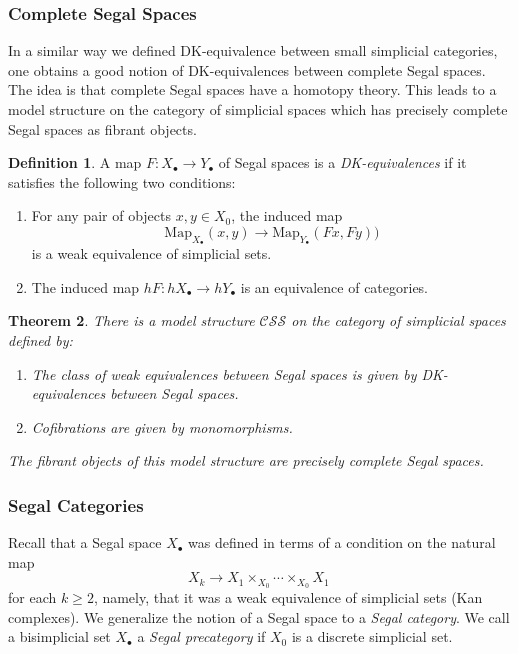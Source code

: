 \documentclass[a4paper,11pt]{article}
\newcommand{\ccal}{\mathcal{C}}
\newcommand{\scal}{\mathcal{S}}
\theoremstyle{plain}
\newtheorem{thm}{Theorem}[section]
\theoremstyle{definition}
\newtheorem{defi}[thm]{Definition}
\theoremstyle{remark}
\begin{document}
\subsubsection{Complete Segal Spaces}

In a similar way we defined DK-equivalence between small simplicial categories, one obtains a good notion of DK-equivalences between complete Segal spaces. The idea is that complete Segal spaces have a  homotopy theory. This leads to a model structure on the category of simplicial spaces which has precisely complete Segal spaces as fibrant objects. 

\begin{defi}
A map $F \colon X_{\bullet} \to Y_{\bullet}$ of Segal spaces is a \textit{DK-equivalences} if it satisfies the following two conditions:
\begin{enumerate}[label = \arabic*)]
    \item For any pair of objects $x, y \in X_0$, the induced map 
    $$\text{Map}_{X_{\bullet}}(x,y) \to \text{Map}_{Y_{\bullet}}(Fx, Fy))$$
    is a weak equivalence of simplicial sets. 
    \item The induced map $h F \colon h X_{\bullet} \to hY_{\bullet}$ is an equivalence of categories.
\end{enumerate}
\end{defi}

\begin{thm}
There is a model structure $\ccal \scal \scal$ on the category of simplicial spaces defined by: 
\begin{enumerate}[label= \arabic*)]
    \item The class of weak equivalences between Segal spaces is given by DK-equivalences between Segal spaces. 
    \item Cofibrations are given by monomorphisms. 
\end{enumerate}
The fibrant objects of this model structure are precisely complete Segal spaces. 
\end{thm}


\subsubsection{Segal Categories}

Recall that a Segal space $X_{\bullet}$ was defined in terms of a condition on the natural map 
$$X_k \to X_1  \times_{X_0} \cdots \times_{X_0} X_1 \, $$
for each $k \geq 2$, namely, that it was a weak equivalence of simplicial sets (Kan complexes). We generalize the notion of a Segal space to a \textit{Segal category}. We call a bisimplicial set $X_{\bullet}$ a \textit{Segal precategory} if $X_0$ is a discrete simplicial set.
\end{document}
